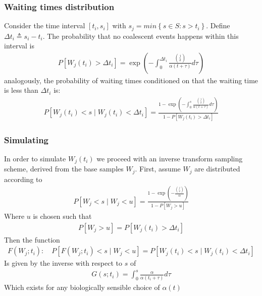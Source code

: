\documentclass{report}
\theoremstyle{definition}
\begin{document}
\subsubsection{Waiting times distribution}
Consider the time interval $[t_i, s_i]$ with $s_j = min\left\{s\in S : s>t_i\right\}$. Define $\Delta t_i \triangleq s_i-t_i$.
The probability that no coalescent events happens within this interval is 
\begin{gather*}
  P[W_j(t_i) > \Delta t_i] = \exp(-\int_0^{\Delta t_i}\frac{\binom{j}{2}}{\alpha(t+\tau)}d\tau)
\end{gather*}
analogously, the probability of waiting times conditioned on that the waiting time is less than $\Delta t_i$ is:
\begin{gather}
  P[W_j(t_i) < s \mid W_j(t_i) < \Delta t_i] =\frac{1-\exp(-\int_0^{s}\frac{\binom{j}{2}}{\alpha(t+\tau)}d\tau)}{1-P[W_j(t_i) > \Delta t_i]}
\end{gather}
\subsubsection{Simulating}
In order to simulate $W_j(t_i)$ we proceed with an inverse transform sampling scheme, derived from the base samples $W_j$. 
First, assume $W_j$ are distributed according to 
\begin{gather}
  P[W_j < s \mid W_j < u] = \frac{1-\exp(-\frac{\binom{j}{2}}{\alpha})}{1-P[W_j>u]}
\end{gather}
Where $u$ is chosen such that
\begin{gather}
P[W_j>u] = P[W_j(t_i) > \Delta t_i]
\end{gather}
Then the function
\begin{gather}
F(W_j; t_i):\quad P[F(W_j;t_i) < s \mid W_j < u] = P[W_j(t_i) < s \mid W_j(t_i) < \Delta t_i] 
\end{gather}
Is given by the inverse with respect to $s$ of
\begin{gather}
G(s; t_i) = \int_0^s \frac{\alpha}{\alpha(t_i+\tau)}d\tau
\end{gather}
Which exists for any biologically sensible choice of $\alpha(t)$
\end{document}
